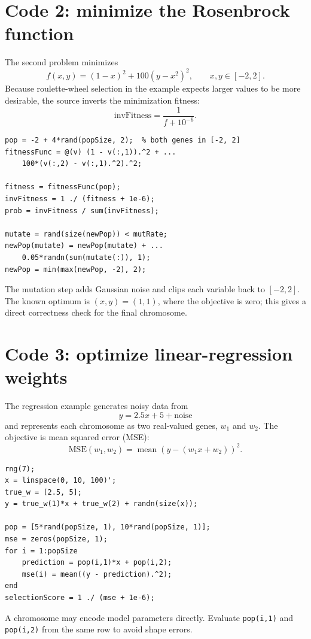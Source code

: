 \section{Code 2: minimize the Rosenbrock function}

The second problem minimizes
\[
f(x,y)=(1-x)^2+100(y-x^2)^2,
\qquad x,y\in[-2,2].
\]
Because roulette-wheel selection in the example expects larger values to be more desirable, the source inverts the minimization fitness:
\[
\text{invFitness}=\frac{1}{f+10^{-6}}.
\]

\begin{lstlisting}[style=mlmatlab]
pop = -2 + 4*rand(popSize, 2);  % both genes in [-2, 2]
fitnessFunc = @(v) (1 - v(:,1)).^2 + ...
    100*(v(:,2) - v(:,1).^2).^2;

fitness = fitnessFunc(pop);
invFitness = 1 ./ (fitness + 1e-6);
prob = invFitness / sum(invFitness);

mutate = rand(size(newPop)) < mutRate;
newPop(mutate) = newPop(mutate) + ...
    0.05*randn(sum(mutate(:)), 1);
newPop = min(max(newPop, -2), 2);
\end{lstlisting}

The mutation step adds Gaussian noise and clips each variable back to \([-2,2]\). The known optimum is \((x,y)=(1,1)\), where the objective is zero; this gives a direct correctness check for the final chromosome.

\section{Code 3: optimize linear-regression weights}

The regression example generates noisy data from
\[
y=2.5x+5+\text{noise}
\]
and represents each chromosome as two real-valued genes, \(w_1\) and \(w_2\). The objective is mean squared error (MSE):
\[
\mathrm{MSE}(w_1,w_2)=\operatorname{mean}
\left(y-(w_1x+w_2)\right)^2.
\]

\begin{lstlisting}[style=mlmatlab]
rng(7);
x = linspace(0, 10, 100)';
true_w = [2.5, 5];
y = true_w(1)*x + true_w(2) + randn(size(x));

pop = [5*rand(popSize, 1), 10*rand(popSize, 1)];
mse = zeros(popSize, 1);
for i = 1:popSize
    prediction = pop(i,1)*x + pop(i,2);
    mse(i) = mean((y - prediction).^2);
end
selectionScore = 1 ./ (mse + 1e-6);
\end{lstlisting}

A chromosome may encode model parameters directly. Evaluate \texttt{pop(i,1)} and \texttt{pop(i,2)} from the same row to avoid shape errors.

